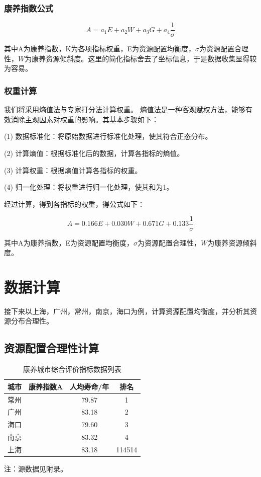 \documentclass[12pt,a4paper]{article}
\begin{document}
\subsubsection{康养指数公式}

\[
A = a_1E + a_2W + a_3G + a_4\frac{1}{\sigma}
\]

其中A为康养指数，K为各项指标权重，E为资源配置均衡度，$\sigma$为资源配置合理性，$W$为康养资源倾斜度。这里的简化指标舍去了坐标信息，于是数据收集显得较为容易。

\subsubsection{权重计算}

我们将采用熵值法\cite{02}与专家打分法计算权重。
熵值法是一种客观赋权方法，能够有效消除主观因素对权重的影响。其基本步骤如下：

(1) 数据标准化：将原始数据进行标准化处理，使其符合正态分布。

(2) 计算熵值：根据标准化后的数据，计算各指标的熵值。

(3) 计算权重：根据熵值计算各指标的权重。

(4) 归一化处理：将权重进行归一化处理，使其和为1。

经过计算，得到各指标的权重，得公式如下：

\[
A = 0.166E + 0.030W + 0.671G + 0.133\frac{1}{\sigma}
\]

其中A为康养指数，E为资源配置均衡度，$\sigma$为资源配置合理性，$W$为康养资源倾斜度。


\section{数据计算}

接下来以上海，广州，常州，南京，海口为例，计算资源配置均衡度，并分析其资源分布合理性。
\subsection{资源配置合理性计算}

\begin{table}[h]
  \centering
  \caption{康养城市综合评价指标数据列表}
  \begin{tabular}{c|c|c|c}
    \toprule[2pt]
    城市 &康养指数A&人均寿命/年&排名\\
    \midrule[1pt]
    常州 &  & 79.87 & 1 \\
    广州 &  & 83.18 & 2 \\
    海口 &  & 79.60 & 3 \\
    南京 &  & 83.32 & 4 \\
    上海 &  & 83.18 & 114514 \\
    \bottomrule[2pt]
  \end{tabular}

  \vspace{0.5em}
  {\footnotesize 注：源数据见附录。}
\end{table}
\end{document}

